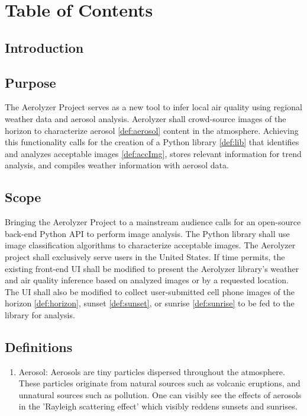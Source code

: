 \documentclass[journal,10pt,draftclsnofoot,onecolumn]{IEEEtran}
\begin{document}
\section{Table of Contents}
\tableofcontents
\clearpage

\begin{singlespace}

\section{Introduction}

	\subsection{Purpose}
		The Aerolyzer Project serves as a new tool to infer local air quality using regional weather data and aerosol analysis.
		Aerolyzer shall crowd-source images of the horizon to characterize aerosol \ref{def:aerosol} content in the atmosphere.
		Achieving this functionality calls for the creation of a Python library \ref{def:lib} that identifies and analyzes acceptable images \ref{def:accImg}, stores relevant information for trend analysis, and compiles weather information with aerosol data. 

	\subsection{Scope}
		Bringing the Aerolyzer Project to a mainstream audience calls for an open-source back-end Python API to perform image analysis.
		The Python library shall use image classification algorithms to characterize acceptable images.
		The Aerolyzer project shall exclusively serve users in the United States.
		If time permits, the existing front-end UI shall be modified to present the Aerolyzer library's weather and air quality inference based on analyzed images or by a requested location.
		The UI shall also be modified to collect user-submitted cell phone images of the horizon \ref{def:horizon}, sunset \ref{def:sunset}, or sunrise \ref{def:sunrise} to be fed to the library for analysis.

	\subsection{Definitions}
		\begin{enumerate}
			\item \label{def:aerosol} Aerosol:
			Aerosols are tiny particles dispersed throughout the atmosphere.
			These particles originate from natural sources such as volcanic eruptions, and unnatural sources such as pollution. 
			One can visibly see the effects of aerosols in the 'Rayleigh scattering effect' which visibly reddens sunsets and sunrises.


\end{enumerate}
\end{singlespace}
\end{document}
